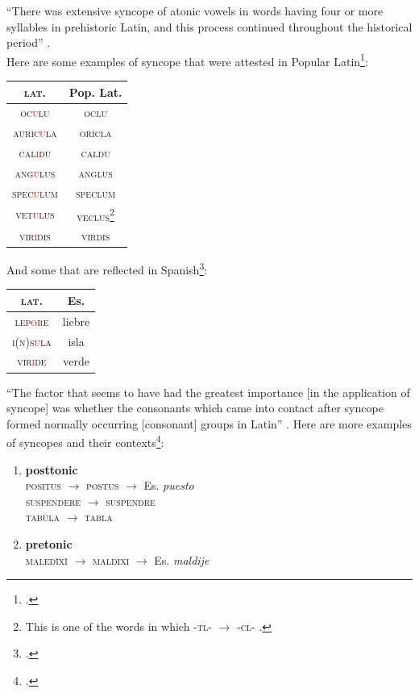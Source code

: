 \documentclass{report}[12pt]
\begin{document}
``There was extensive syncope of atonic vowels in words having four or more syllables in prehistoric Latin, and this process continued throughout the historical period'' \parencite[p.~113]{lloyd_spanish}. \\
Here are some examples of syncope that were attested in Popular Latin\footcites[p.~28-29]{romance_his}[p.~114]{lloyd_spanish}:
\begin{center}
  \begin{tabular}{c c}
    \textsc{lat.} & Pop. Lat. \\
    \hline
    \textsc{oc\textcolor{red}{u}lu} & \textsc{oclu} \\
    \textsc{auric\textcolor{red}{u}la} & \textsc{oricla} \\
    \textsc{cal\textcolor{red}{i}du} & \textsc{caldu} \\
    \textsc{ang\textcolor{red}{u}lus} & \textsc{anglus} \\
    \textsc{spec\textcolor{red}{u}lum} & \textsc{speclum} \\
    \textsc{vet\textcolor{red}{u}lus} & \textsc{veclus}\footnote{This is one of the words in which \textsc{-tl-} $\rightarrow$ \textsc{-cl-} \parencite[p.~68]{romance_his}.} \\
    \textsc{vir\textcolor{red}{i}dis} & \textsc{virdis} \\
  \end{tabular}
\end{center}
And some that are reflected in Spanish\footcite[p.~29]{romance_his}:
\begin{center}
  \begin{tabular}{c c}
    \textsc{lat.} & Es. \\
    \hline
    \textsc{lep\textcolor{red}{o}re} & liebre \\
    \textsc{i(n)s\textcolor{red}{u}la} & isla \\
    \textsc{vir\textcolor{red}{i}de} & verde \\
  \end{tabular}
\end{center}
``The factor that seems to have had the greatest importance [in the application of syncope] was whether the consonants which came into contact after syncope formed normally occurring [consonant] groups in Latin'' \parencite[p.~114]{lloyd_spanish}. Here are more examples of syncopes and their contexts\footcite[p.~114]{lloyd_spanish}:
\begin{enumerate}
\item \textbf{posttonic} \\
  \textsc{positus} $\rightarrow$ \textsc{postus} $\rightarrow$ Es. \emph{puesto} \\
  \textsc{suspendere} $\rightarrow$ \textsc{suspendre} \\
  \textsc{tabula} $\rightarrow$ \textsc{tabla}
\item \textbf{pretonic} \\
  \textsc{maled\={i}x\={i}} $\rightarrow$ \textsc{maldixi} $\rightarrow$ Es. \emph{maldije}
\end{enumerate}
\end{document}
